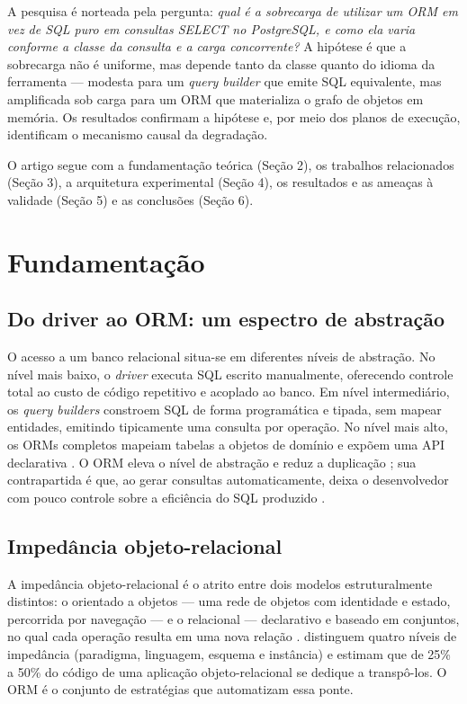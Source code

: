 \documentclass[12pt]{article}
\begin{document}
A pesquisa é norteada pela pergunta: \textit{qual é a sobrecarga de
utilizar um ORM em vez de SQL puro em consultas SELECT no PostgreSQL, e
como ela varia conforme a classe da consulta e a carga concorrente?} A
hipótese é que a sobrecarga não é uniforme, mas depende tanto da classe
quanto do idioma da ferramenta --- modesta para um \textit{query builder}
que emite SQL equivalente, mas amplificada sob carga para um ORM que
materializa o grafo de objetos em memória. Os resultados confirmam a
hipótese e, por meio dos planos de execução, identificam o mecanismo
causal da degradação.

O artigo segue com a fundamentação teórica (Seção 2), os trabalhos
relacionados (Seção 3), a arquitetura experimental (Seção 4), os
resultados e as ameaças à validade (Seção 5) e as conclusões (Seção 6).

\section{Fundamentação}

\subsection{Do driver ao ORM: um espectro de abstração}

O acesso a um banco relacional situa-se em diferentes níveis de
abstração. No nível mais baixo, o \textit{driver} executa SQL escrito
manualmente, oferecendo controle total ao custo de código repetitivo e
acoplado ao banco. Em nível intermediário, os \textit{query builders}
constroem SQL de forma programática e tipada, sem mapear entidades,
emitindo tipicamente uma consulta por operação. No nível mais alto, os
ORMs completos mapeiam tabelas a objetos de domínio e expõem uma API
declarativa \cite{nicoletti2024}. O ORM eleva o nível de abstração e
reduz a duplicação \cite{oliveira2024}; sua contrapartida é que, ao gerar
consultas automaticamente, deixa o desenvolvedor com pouco controle sobre
a eficiência do SQL produzido \cite{nicoletti2024}.

\subsection{Impedância objeto-relacional}

A impedância objeto-relacional é o atrito entre dois modelos
estruturalmente distintos: o orientado a objetos --- uma rede de objetos
com identidade e estado, percorrida por navegação --- e o relacional ---
declarativo e baseado em conjuntos, no qual cada operação resulta em uma
nova relação \cite{teixeira2017}. \cite{ireland2009} distinguem quatro
níveis de impedância (paradigma, linguagem, esquema e instância) e
estimam que de 25\% a 50\% do código de uma aplicação objeto-relacional
se dedique a transpô-los. O ORM é o conjunto de estratégias que
automatizam essa ponte.
\end{document}
